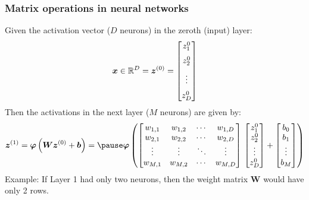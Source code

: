 \documentclass[smaller]{beamer}
\begin{document}
\begin{frame}
  \frametitle{Matrix operations in neural networks}
  \pause

  Given the activation vector ($D$ neurons) in the zeroth (input) layer:
  \begin{equation}
   \bm x \in \mathbb{R}^D = \bm z^{(0)} =   \begin{bmatrix}
    z_1^{0}\\[2mm]
    z_2^{0}\\[2mm]
    \vdots \\[2mm]
    z_D^{0}\\
    \end{bmatrix}
  \end{equation}
  \pause
  Then the activations in the next layer ($M$ neurons) are given by:\pause
  \begin{equation}
    \bm{z}^{(1)}=
    \bm\varphi\left(
    \boldsymbol{W}\bm z^{(0)}+ \bm b
  \right)
  = \pause
  \bm\varphi \left(
    \begin{bmatrix}
      w_{1,1} & w_{1,2} & \cdots & w_{1,D}\\
      w_{2,1} & w_{2,2} & \cdots & w_{2,D}\\
      \vdots & \vdots & \ddots & \vdots \\
    w_{M,1} & w_{M,2} & \cdots & w_{M,D}\\
    \end{bmatrix}
    \, 
    \begin{bmatrix}
    z_1^{0}\\
    z_2^{0}\\
    \vdots \\
    z_{D}^{0}\\
    \end{bmatrix}
    +
    \begin{bmatrix}
    b_0\\
    b_1\\
    \vdots \\
    b_{M}\\
    \end{bmatrix}
    \right)
  \end{equation}
  \pause
  Example: If Layer 1 had only two neurons, then the weight matrix $\bm W$ would have only 2 rows.
\end{frame}
\end{document}
